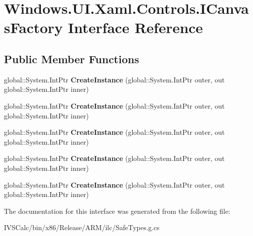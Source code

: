 \hypertarget{interface_windows_1_1_u_i_1_1_xaml_1_1_controls_1_1_i_canvas_factory}{}\section{Windows.\+U\+I.\+Xaml.\+Controls.\+I\+Canvas\+Factory Interface Reference}
\label{interface_windows_1_1_u_i_1_1_xaml_1_1_controls_1_1_i_canvas_factory}
\subsection*{Public Member Functions}
\begin{DoxyCompactItemize}
\item 
\mbox{\label{interface_windows_1_1_u_i_1_1_xaml_1_1_controls_1_1_i_canvas_factory_aabe125268191a4fb919ab453c4c9bca7}} 
global\+::\+System.\+Int\+Ptr {\bfseries Create\+Instance} (global\+::\+System.\+Int\+Ptr outer, out global\+::\+System.\+Int\+Ptr inner)
\item 
\mbox{\label{interface_windows_1_1_u_i_1_1_xaml_1_1_controls_1_1_i_canvas_factory_aabe125268191a4fb919ab453c4c9bca7}} 
global\+::\+System.\+Int\+Ptr {\bfseries Create\+Instance} (global\+::\+System.\+Int\+Ptr outer, out global\+::\+System.\+Int\+Ptr inner)
\item 
\mbox{\label{interface_windows_1_1_u_i_1_1_xaml_1_1_controls_1_1_i_canvas_factory_aabe125268191a4fb919ab453c4c9bca7}} 
global\+::\+System.\+Int\+Ptr {\bfseries Create\+Instance} (global\+::\+System.\+Int\+Ptr outer, out global\+::\+System.\+Int\+Ptr inner)
\item 
\mbox{\label{interface_windows_1_1_u_i_1_1_xaml_1_1_controls_1_1_i_canvas_factory_aabe125268191a4fb919ab453c4c9bca7}} 
global\+::\+System.\+Int\+Ptr {\bfseries Create\+Instance} (global\+::\+System.\+Int\+Ptr outer, out global\+::\+System.\+Int\+Ptr inner)
\item 
\mbox{\label{interface_windows_1_1_u_i_1_1_xaml_1_1_controls_1_1_i_canvas_factory_aabe125268191a4fb919ab453c4c9bca7}} 
global\+::\+System.\+Int\+Ptr {\bfseries Create\+Instance} (global\+::\+System.\+Int\+Ptr outer, out global\+::\+System.\+Int\+Ptr inner)
\end{DoxyCompactItemize}


The documentation for this interface was generated from the following file\+:\begin{DoxyCompactItemize}
\item 
I\+V\+S\+Calc/bin/x86/\+Release/\+A\+R\+M/ilc/Safe\+Types.\+g.\+cs\end{DoxyCompactItemize}
